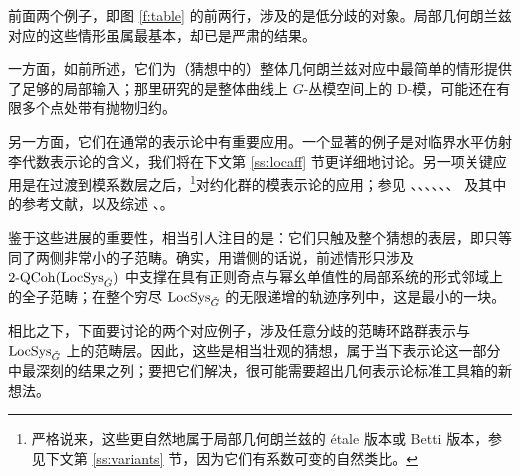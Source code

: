 \ssszh 前面两个例子，即图 \ref{f:table} 的前两行，涉及的是低分歧的对象。局部几何朗兰兹对应的这些情形虽属最基本，却已是严肃的结果。

一方面，如前所述，它们为（猜想中的）整体几何朗兰兹对应中最简单的情形提供了足够的局部输入；那里研究的是整体曲线上 $G$-丛模空间上的 D-模，可能还在有限多个点处带有抛物归约。



另一方面，它们在通常的表示论中有重要应用。一个显著的例子是对临界水平仿射李代数表示论的含义，我们将在下文第 \ref{ss:locaff} 节更详细地讨论。另一项关键应用是在过渡到模系数层之后，\footnote{严格说来，这些更自然地属于局部几何朗兰兹的 \'etale 版本或 Betti 版本，参见下文第 \ref{ss:variants} 节，因为它们有系数可变的自然类比。}对约化群的模表示论的应用；参见 \cite{finkelbergmirkovicconjecture}、\cite{mirkovic-vilonen}、\cite{acharrider}、\cite{richewilliamsontilting}、\cite{bezgaitsmiriwahotiwhittaker}、\cite{bezricheriderregcentralizer}、\cite{bezricheprinblock} 及其中的参考文献，以及综述 \cite{willimasonsurvey1}、\cite{williamsonsurvey2}。


鉴于这些进展的重要性，相当引人注目的是：它们只触及整个猜想的表层，即只等同了两侧非常小的子范畴。确实，用谱侧的话说，前述情形只涉及 $\operatorname{2-QCoh}(\operatorname{LocSys}_{\check{G}})$ 中支撑在具有正则奇点与幂幺单值性的局部系统的形式邻域上的全子范畴；在整个穷尽 $\operatorname{LocSys}_{\check{G}}$ 的无限递增的轨迹序列中，这是最小的一块。



相比之下，下面要讨论的两个对应例子，涉及任意分歧的范畴环路群表示与 $\operatorname{LocSys}_{\check{G}}$ 上的范畴层。因此，这些是相当壮观的猜想，属于当下表示论这一部分中最深刻的结果之列；要把它们解决，很可能需要超出几何表示论标准工具箱的新想法。
